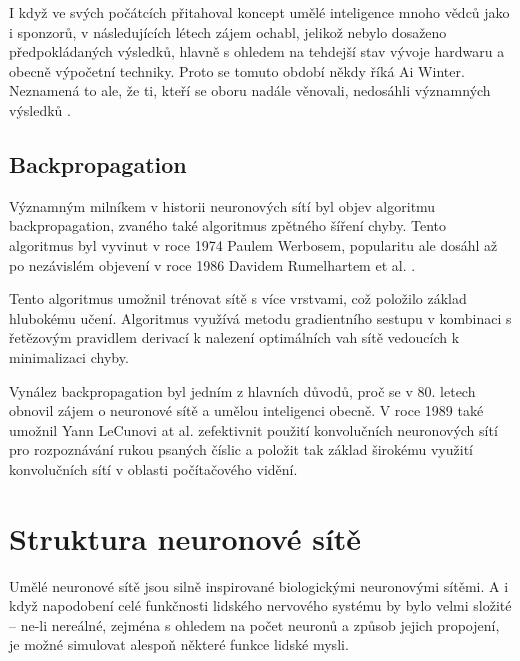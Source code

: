 I když ve svých počátcích přitahoval koncept umělé inteligence mnoho vědců jako
i sponzorů, v následujících létech zájem ochabl, jelikož nebylo dosaženo
předpokládaných výsledků, hlavně s ohledem na tehdejší stav vývoje hardwaru a
obecně výpočetní techniky. Proto se tomuto období někdy říká Ai Winter.
Neznamená to ale, že ti, kteří se oboru nadále věnovali, nedosáhli významných
výsledků \cite{nn_history}.

\subsection{Backpropagation}
Významným milníkem v historii neuronových sítí byl objev algoritmu
backpropagation, zvaného také algoritmus zpětného šíření chyby. Tento
algoritmus byl vyvinut v roce 1974 Paulem Werbosem, popularitu ale dosáhl až po
nezávislém objevení v roce 1986 Davidem Rumelhartem et al.
\cite{backpropagation}.

Tento algoritmus umožnil trénovat sítě s více vrstvami, což položilo základ
hlubokému učení. Algoritmus využívá metodu gradientního sestupu v kombinaci s
řetězovým pravidlem derivací k nalezení optimálních vah sítě vedoucích k
minimalizaci chyby.

Vynález backpropagation byl jedním z hlavních důvodů, proč se v 80. letech
obnovil zájem o neuronové sítě a umělou inteligenci obecně. V roce 1989 také
umožnil Yann LeCunovi at al. zefektivnit použití konvolučních neuronových sítí
pro rozpoznávání rukou psaných číslic \cite{lecun1989} a položit tak základ
širokému využití konvolučních sítí v oblasti počítačového vidění.

\section{Struktura neuronové sítě}

Umělé neuronové sítě jsou silně inspirované biologickými neuronovými sítěmi. A
i když napodobení celé funkčnosti lidského nervového systému by bylo velmi
složité – ne-li nereálné, zejména s ohledem na počet neuronů a způsob jejich
propojení, je možné simulovat alespoň některé funkce lidské mysli.


